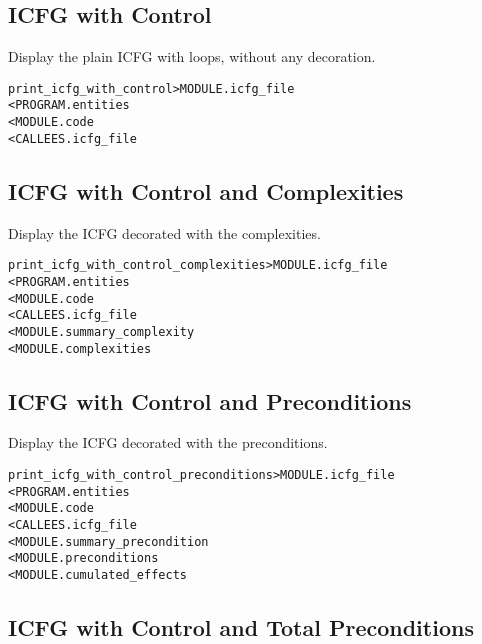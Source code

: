 \documentclass[a4paper]{report}
\newenvironment{PipsMake}{\begin{alltt}}{\end{alltt}}
\newenvironment{PipsPass}[1]{\label{pass:#1}}{}
\begin{document}
\subsection{ICFG with Control}

\begin{PipsPass}{print_icfg_with_control}
Display the plain ICFG with loops, without any decoration.
\end{PipsPass}
\begin{PipsMake}
print_icfg_with_control         > MODULE.icfg_file
        < PROGRAM.entities
        < MODULE.code
        < CALLEES.icfg_file
\end{PipsMake}

\subsection{ICFG with Control and Complexities}

\begin{PipsPass}{print_icfg_with_control_complexities}
Display the ICFG decorated with the complexities.
\end{PipsPass}
\begin{PipsMake}
print_icfg_with_control_complexities    > MODULE.icfg_file
        < PROGRAM.entities
        < MODULE.code
        < CALLEES.icfg_file
        < MODULE.summary_complexity
        < MODULE.complexities
\end{PipsMake}

\subsection{ICFG with Control and Preconditions}

\begin{PipsPass}{print_icfg_with_control_preconditions}
Display the ICFG decorated with the preconditions.
\end{PipsPass}
\begin{PipsMake}
print_icfg_with_control_preconditions   > MODULE.icfg_file
        < PROGRAM.entities
        < MODULE.code
        < CALLEES.icfg_file
        < MODULE.summary_precondition
        < MODULE.preconditions
        < MODULE.cumulated_effects
\end{PipsMake}

\subsection{ICFG with Control and Total Preconditions}
\end{document}
